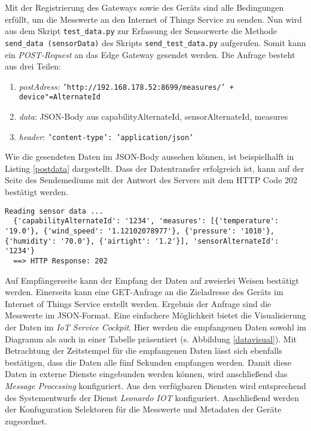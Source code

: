 Mit der Registrierung des Gateways sowie des Geräts sind alle Bedingungen erfüllt, um die Messwerte an den Internet of Things Service zu senden. Nun wird aus dem Skript \texttt{test\_data.py} zur Erfassung der Sensorwerte die Methode \texttt{send\_data (sensorData)} des Skripts \texttt{send\_test\_data.py} aufgerufen. Somit kann ein \textit{POST-Request} an das Edge Gateway gesendet werden. Die Anfrage besteht aus drei Teilen:
\begin{enumerate}
  \item \textit{postAdress:} \texttt{'http://192.168.178.52:8699/measures/' + device"=AlternateId}
  \item \textit{data}: JSON-Body aus capabilityAlternateId, sensorAlternateId, measures
  \item \textit{header}: \texttt{'content-type': 'application/json'}
\end{enumerate}

\noindent Wie die gesendeten Daten im JSON-Body aussehen können, ist beispielhalft in Listing \ref{postdata} dargestellt. Dass der Datentransfer erfolgreich ist, kann auf der Seite des Sendemediums mit der Antwort des Servers mit dem HTTP Code 202 bestätigt werden.

\begin{lstlisting}[caption= Das Data-Feld der POST-Anfrage, label=postdata]
  Reading sensor data ...
  {'capabilityAlternateId': '1234', 'measures': [{'temperature': '19.0'}, {'wind_speed': '1.12102078977'}, {'pressure': '1010'}, {'humidity': '70.0'}, {'airtight': '1.2'}], 'sensorAlternateId': '1234'}
  ==> HTTP Response: 202 \end{lstlisting}

\noindent Auf Empfängerseite kann der Empfang der Daten auf zweierlei Weisen bestätigt werden. Einerseits kann eine GET-Anfrage an die Zieladresse des Geräts im Internet of Things Service erstellt werden. Ergebnis der Anfrage sind die Messwerte im JSON-Format. Eine einfachere Möglichkeit bietet die Visualisierung der Daten im \textit{IoT Service Cockpit}. Hier werden die empfangenen Daten sowohl im Diagramm als auch in einer Tabelle präsentiert (s. Abbildung \ref{datavisual}). Mit Betrachtung der Zeitstempel für die empfangenen Daten lässt sich ebenfalls bestätigen, dass die Daten alle fünf Sekunden empfangen werden. Damit diese Daten in externe Dienste eingebunden werden können, wird anschließend das \textit{Message Processing} konfiguriert. Aus den verfügbaren Diensten wird entsprechend des Systementwurfs der Dienst \textit{\glqq Leonardo IOT\grqq{}} konfiguriert. Anschließend werden der Konfuguration Selektoren für die Messwerte und Metadaten der Geräte zugeordnet.

